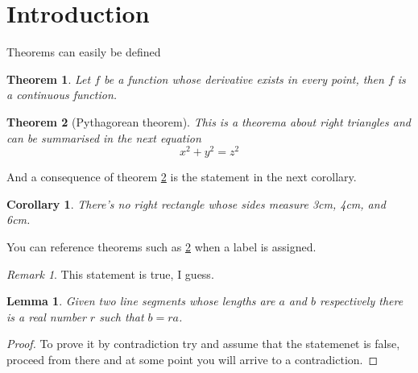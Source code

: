 \documentclass{article}
\newtheorem{theorem}{Theorem}[section]%
\newtheorem{corollary}{Corollary}[theorem]%
\newtheorem{lemma}{Lemma}%
\numberwithin{lemma}{section}
\theoremstyle{remark}
\newtheorem*{remark}{Remark}
\begin{document}
\section{Introduction}
Theorems can easily be defined

\begin{theorem}
Let $f$ be a function whose derivative exists in every point, then $f$ is a continuous function.
\end{theorem}

\begin{theorem}[Pythagorean theorem]
\label{pythagorean}
This is a theorema about right triangles and can be summarised in the next equation
\[ x^2 + y^2 = z^2 \]
\end{theorem}

And a consequence of theorem \ref{pythagorean} is the statement in the next corollary.

\begin{corollary}
There's no right rectangle whose sides measure 3cm, 4cm, and 6cm.
\end{corollary}

You can reference theorems such as \ref{pythagorean} when a label is assigned.

\begin{remark}
    This statement is true, I guess.
\end{remark}

\setcounter{lemma}{2}
\begin{lemma}
Given two line segments whose lengths are $a$ and $b$ respectively there is a real number $r$ such that $b=ra$.
\end{lemma}

\begin{proof}
    To prove it by contradiction try and assume that the statemenet is false,
    proceed from there and at some point you will arrive to a contradiction.
\end{proof}
\end{document}
